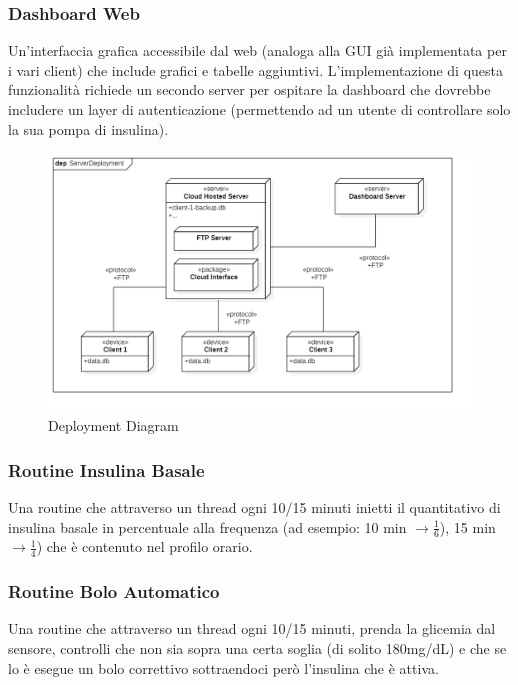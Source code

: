 \documentclass[twocolumn]{article}
\begin{document}
\subsubsection{Dashboard Web}

Un'interfaccia grafica accessibile dal web (analoga alla GUI già implementata per i vari client) che include grafici e tabelle aggiuntivi. L'implementazione di questa funzionalità richiede un secondo server per ospitare la dashboard che dovrebbe includere un layer di autenticazione (permettendo ad un utente di controllare solo la sua pompa di insulina).

\vspace{0.75em}
\begin{figure}[H]
    \centering
    \includegraphics[width=14cm]{images/ServerDeployment.png}
    \caption{Deployment Diagram}
    \label{fig:deployment}
\end{figure}

\subsubsection{Routine Insulina Basale}

Una routine che attraverso un thread ogni 10/15 minuti inietti il quantitativo di insulina basale in percentuale alla frequenza (ad esempio: 10 min \(\rightarrow \frac{1}{6}\)), 15 min \(\rightarrow \frac{1}{4}\)) che è contenuto nel profilo orario.

\subsubsection{Routine Bolo Automatico}
Una routine che attraverso un thread ogni 10/15 minuti, prenda la glicemia dal sensore, controlli che non sia sopra una certa soglia (di solito 180mg/dL) e che se lo è esegue un bolo correttivo sottraendoci però l'insulina che è attiva.
\end{document}

